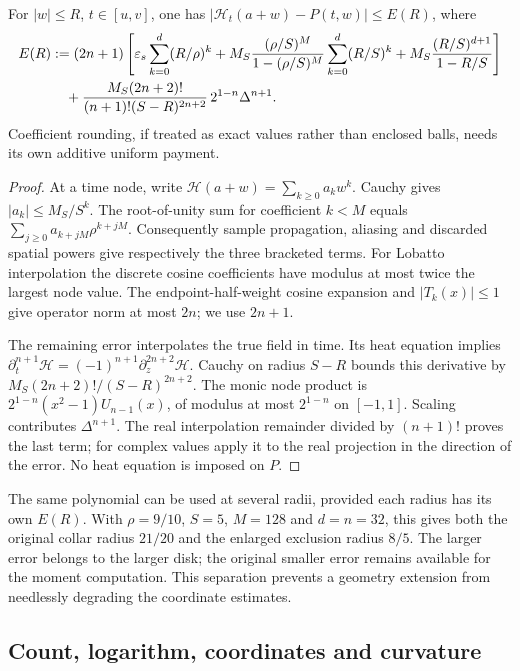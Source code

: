 \begin{proposition}
\label{prop:gt-tensor-error}
For \(|w|\le R\), \(t\in[u,v]\), one has
\(|\mathcal H_t(a+w)-P(t,w)|\le E(R)\), where
\begin{align}
 E(R)&:=(2n+1)\left[
 \varepsilon_s\sum_{k=0}^d(R/\rho)^k
 +M_S\frac{(\rho/S)^M}{1-(\rho/S)^M}
                \sum_{k=0}^d(R/S)^k
 +M_S\frac{(R/S)^{d+1}}{1-R/S}\right]\notag\\
 &\quad+
 \frac{M_S(2n+2)!}{(n+1)!(S-R)^{2n+2}}\,
            2^{1-n}\Delta^{n+1}.
 \label{eq:gt-tensor-error}
\end{align}
Coefficient rounding, if treated as exact values rather than enclosed
balls, needs its own additive uniform payment.
\end{proposition}
\begin{proof}
At a time node, write
\(\mathcal H(a+w)=\sum_{k\ge0}a_kw^k\).
Cauchy gives \(|a_k|\le M_S/S^k\).
The root-of-unity sum for coefficient \(k<M\) equals
\(\sum_{j\ge0}a_{k+jM}\rho^{k+jM}\).
Consequently sample propagation, aliasing and discarded spatial powers
give respectively the three bracketed terms.
For Lobatto interpolation the discrete cosine coefficients have modulus
at most twice the largest node value. The endpoint-half-weight cosine
expansion and \(|T_k(x)|\le1\) give operator norm at most \(2n\);
we use \(2n+1\).

The remaining error interpolates the true field in time.
Its heat equation implies
\(\partial_t^{n+1}\mathcal H=(-1)^{n+1}\partial_z^{2n+2}\mathcal H\).
Cauchy on radius \(S-R\) bounds this derivative by
\(M_S(2n+2)!/(S-R)^{2n+2}\).
The monic node product is
\(2^{1-n}(x^2-1)U_{n-1}(x)\), of modulus at most \(2^{1-n}\)
on \([-1,1]\). Scaling contributes \(\Delta^{n+1}\).
The real interpolation remainder divided by \((n+1)!\) proves the
last term; for complex values apply it to the real projection in the
direction of the error. No heat equation is imposed on \(P\).
\end{proof}

The same polynomial can be used at several radii, provided each radius
has its own \(E(R)\). With \(\rho=9/10\), \(S=5\), \(M=128\) and
\(d=n=32\), this gives both the original collar radius \(21/20\)
and the enlarged exclusion radius \(8/5\). The larger error belongs
to the larger disk; the original smaller error remains available for
the moment computation. This separation prevents a geometry extension
from needlessly degrading the coordinate estimates.

\subsection{Count, logarithm, coordinates and curvature}

